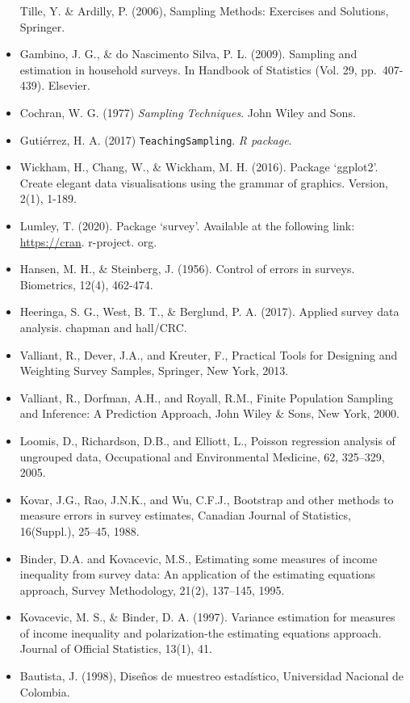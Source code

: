 \documentclass[
  spanish,
  12pt,
]{book}
\begin{document}
\begin{itemize}
  Tille, Y. \& Ardilly, P. (2006), Sampling Methods: Exercises and Solutions, Springer.
\item
  Gambino, J. G., \& do Nascimento Silva, P. L. (2009). Sampling and estimation in household surveys. In Handbook of Statistics (Vol. 29, pp.~407-439). Elsevier.
\item
  Cochran, W. G. (1977) \emph{Sampling Techniques}. John Wiley and Sons.
\item
  Gutiérrez, H. A. (2017) \texttt{TeachingSampling}. \emph{R package}.
\item
  Wickham, H., Chang, W., \& Wickham, M. H. (2016). Package `ggplot2'. Create elegant data visualisations using the grammar of graphics. Version, 2(1), 1-189.
\item
  Lumley, T. (2020). Package `survey'. Available at the following link: \url{https://cran}. r-project. org.
\item
  Hansen, M. H., \& Steinberg, J. (1956). Control of errors in surveys. Biometrics, 12(4), 462-474.
\item
  Heeringa, S. G., West, B. T., \& Berglund, P. A. (2017). Applied survey data analysis. chapman and hall/CRC.
\item
  Valliant, R., Dever, J.A., and Kreuter, F., Practical Tools for Designing and Weighting Survey Samples, Springer, New York, 2013.
\item
  Valliant, R., Dorfman, A.H., and Royall, R.M., Finite Population Sampling and Inference: A Prediction Approach, John Wiley \& Sons, New York, 2000.
\item
  Loomis, D., Richardson, D.B., and Elliott, L., Poisson regression analysis of ungrouped data, Occupational and Environmental Medicine, 62, 325--329, 2005.
\item
  Kovar, J.G., Rao, J.N.K., and Wu, C.F.J., Bootstrap and other methods to measure errors in survey estimates, Canadian Journal of Statistics, 16(Suppl.), 25--45, 1988.
\item
  Binder, D.A. and Kovacevic, M.S., Estimating some measures of income inequality from survey data: An application of the estimating equations approach, Survey Methodology, 21(2), 137--145, 1995.
\item
  Kovacevic, M. S., \& Binder, D. A. (1997). Variance estimation for measures of income inequality and polarization-the estimating equations approach. Journal of Official Statistics, 13(1), 41.
\item
  Bautista, J. (1998), Diseños de muestreo estadístico, Universidad Nacional de Colombia.

\end{itemize}
\end{document}
